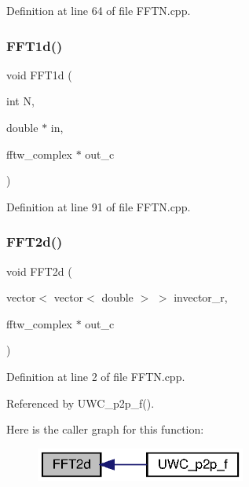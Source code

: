 Definition at line 64 of file F\+F\+T\+N.\+cpp.

\mbox{\label{FFTN_8h_a22d3077cd59f8e921c2acde1977b9383_a22d3077cd59f8e921c2acde1977b9383}} 
\subsubsection{F\+F\+T1d()\hspace{0.1cm}{\footnotesize\ttfamily [2/2]}}
{\footnotesize\ttfamily void F\+F\+T1d (\begin{DoxyParamCaption}\item[{int}]{N,  }\item[{double $\ast$}]{in,  }\item[{fftw\+\_\+complex $\ast$}]{out\+\_\+c }\end{DoxyParamCaption})}



Definition at line 91 of file F\+F\+T\+N.\+cpp.

\mbox{\label{FFTN_8h_a9c926bdffb37048d2b93b1cadfbf11e7_a9c926bdffb37048d2b93b1cadfbf11e7}} 
\subsubsection{F\+F\+T2d()\hspace{0.1cm}{\footnotesize\ttfamily [1/2]}}
{\footnotesize\ttfamily void F\+F\+T2d (\begin{DoxyParamCaption}\item[{vector$<$ vector$<$ double $>$ $>$}]{invector\+\_\+r,  }\item[{fftw\+\_\+complex $\ast$}]{out\+\_\+c }\end{DoxyParamCaption})}



Definition at line 2 of file F\+F\+T\+N.\+cpp.



Referenced by U\+W\+C\+\_\+p2p\+\_\+f().

Here is the caller graph for this function\+:\nopagebreak
\begin{figure}[H]
\begin{center}
\leavevmode
\includegraphics[width=196pt]{FFTN_8h_a9c926bdffb37048d2b93b1cadfbf11e7_a9c926bdffb37048d2b93b1cadfbf11e7_icgraph}
\end{center}
\end{figure}
\mbox{\label{FFTN_8h_af12eeba48614558162aef2c001d16139_af12eeba48614558162aef2c001d16139}} 
